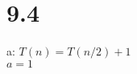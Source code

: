 \documentclass{article}
\begin{document}
                                                                                                                                                                                                                                                                                                                                                                                                                                                                                                                                                                                                                                        
                                                                                                                                                                                                                                                                                                                                                                                                                                                                                                                                                                                                                                                \section{9.4}
                                                                                                                                                                                                                                                                                                                                                                                                                                                                                                                                                                                                                                                        a: $T(n) = T(n/2) + 1$\\
                                                                                                                                                                                                                                                                                                                                                                                                                                                                                                                                                                                                                                                                $a=1$\\
\end{document}
